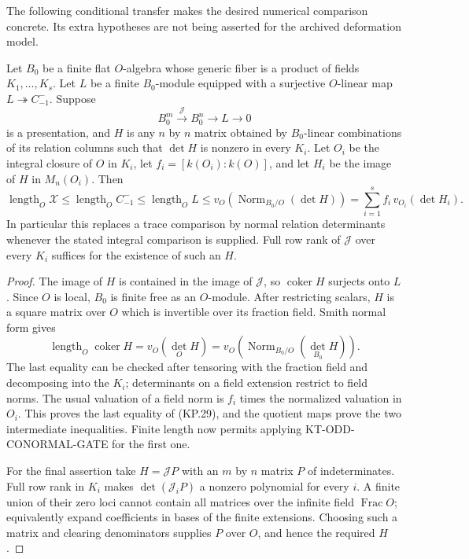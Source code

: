 The following conditional transfer makes the desired
numerical comparison concrete.  Its extra hypotheses are
not being asserted for the archived deformation model.

\begin{lemma}
Let $B_0$ be a finite flat $O$-algebra whose generic fiber
is a product of fields $K_1,\ldots,K_s$.  Let $L$ be a
finite $B_0$-module equipped with a surjective $O$-linear map
$L\twoheadrightarrow C^-_{-1}$.  Suppose
\[
            B_0^m\xrightarrow{\mathcal J} B_0^n
                       \longrightarrow L\longrightarrow0
                                                                  \tag{KP.28}
\]
is a presentation, and $H$ is any $n$ by $n$ matrix obtained
by $B_0$-linear combinations of its relation columns such
that $\det H$ is nonzero in every $K_i$.  Let $O_i$ be the
integral closure of $O$ in $K_i$, let
$f_i=[k(O_i):k(O)]$, and let $H_i$ be the image of $H$ in
$M_n(O_i)$.  Then
\[
 \operatorname{length}_O\mathcal X
 \leq \operatorname{length}_O C^-_{-1}
 \leq \operatorname{length}_O L
 \leq v_O\!\left(\operatorname{Norm}_{B_0/O}(\det H)\right)
 =\sum_{i=1}^s f_i\,v_{O_i}(\det H_i).                      \tag{KP.29}
\]
In particular this replaces a trace comparison by normal
relation determinants whenever the stated integral
comparison is supplied.  Full row rank of $\mathcal J$
over every $K_i$ suffices for the existence of such an $H$.
\end{lemma}
\begin{proof}
The image of $H$ is contained in the image of
$\mathcal J$, so $\operatorname{coker}H$ surjects onto $L$.
Since $O$ is local, $B_0$ is finite free as an $O$-module.
After restricting scalars, $H$ is a square matrix over $O$
which is invertible over its fraction field.  Smith normal
form gives
\[
 \operatorname{length}_O\operatorname{coker}H
     =v_O(\det_O H)
     =v_O\!\left(\operatorname{Norm}_{B_0/O}(\det_{B_0}H)\right).
\]
The last equality can be checked after tensoring with the
fraction field and decomposing into the $K_i$; determinants
on a field extension restrict to field norms.  The usual
valuation of a field norm is $f_i$ times the normalized
valuation in $O_i$.  This proves the last equality of
(KP.29), and the quotient maps prove the two intermediate
inequalities.  Finite length now permits applying
KT-ODD-CONORMAL-GATE for the first one.

For the final assertion take $H=\mathcal J P$ with an
$m$ by $n$ matrix $P$ of indeterminates.  Full row rank in
$K_i$ makes $\det(\mathcal J_iP)$ a nonzero polynomial
for every $i$.  A finite union of their zero loci cannot
contain all matrices over the infinite field
$\operatorname{Frac}O$; equivalently expand coefficients
in bases of the finite extensions.  Choosing such a
matrix and clearing denominators supplies $P$ over $O$,
and hence the required $H$.
\end{proof}

